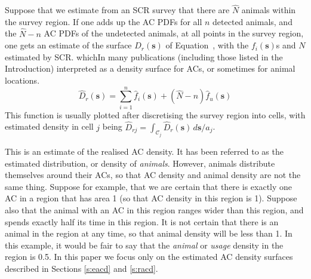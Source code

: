 \documentclass[useAMS,usenatbib,referee]{biom}
\begin{document}
Suppose that we estimate from an SCR survey that there are $\hat{N}$ animals within the survey region. If one adds up the AC PDFs for all $n$ detected animals, and the $\hat{N}-n$ AC PDFs of the undetected animals, at all points in the survey region, one gets an estimate of the surface $D_r(\bm{s})$ of Equation~\label{eq:realised-D}, with the $f_i(\bm{s})$s and $N$ estimated by SCR.  whichIn many publications (including those listed in the Introduction) interpreted as a density surface for ACs, or sometimes for animal locations. %
\begin{equation}
\widehat{D}_r(\bm{s}) = \sum_{i = 1}^n \hat{f}_i(\bm{s}) + (\widehat{N} - n)\hat{f}_u(\bm{s})
\end{equation}
This function is usually plotted after discretising the survey region into cells, with estimated density in cell $j$ being $\widehat{D}_{rj}=\int_{\mathcal{C}_j}\widehat{D}_r(\bm{s})\, d\bm{s}/a_j$.

This is an estimate of the realised AC density. It has been referred to as the estimated distribution, or density of \textit{animals}. However, animals distribute themselves around their ACs, so that AC density and animal density are not the same thing. Suppose for example, that we are certain that there is exactly one AC in a region that has area 1 (so that AC density in this region is 1). Suppose also that the animal with an AC in this region ranges wider than this region, and spends exactly half its time in this region. It is not certain that there is an animal in the region at any time, so that animal density will be less than 1. In this example, it would be fair to say that the \textit{animal} or \textit{usage} density in the region is 0.5. In this paper we focus only on the estimated AC density surfaces described in Sections \ref{s:eacd} and \ref{s:racd}.
\end{document}
